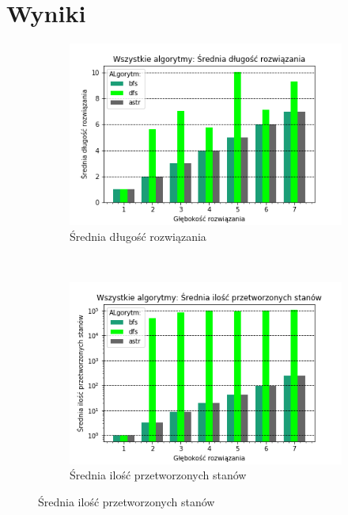 \documentclass{classrep}
\begin{document}
\section{Wyniki}
\begin{figure}[H]
    \centering
    \begin{subfigure}[t]{0.45\textwidth}
        \includegraphics[width=\textwidth]{charts/ALL_path_length.png}
        \caption{Średnia długość rozwiązania}
        \label{ALL:path_length}
    \end{subfigure}
    ~ %
    \begin{subfigure}[t]{0.45\textwidth}
        \includegraphics[width=\textwidth]{charts/ALL_processed.png}
        \caption{Średnia ilość przetworzonych stanów}

\end{subfigure}
\end{figure}
\end{document}
